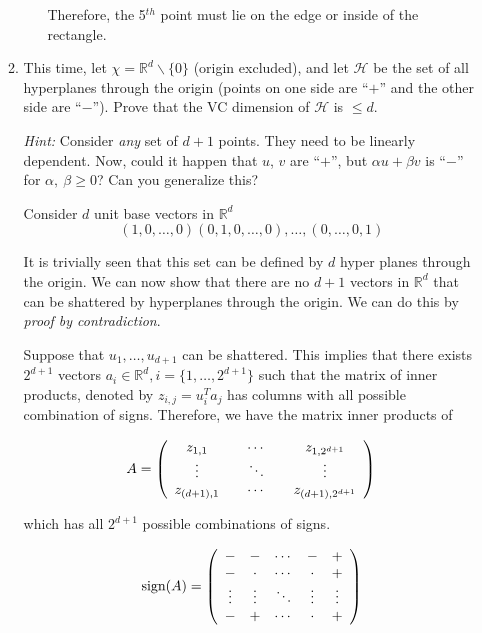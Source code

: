 \documentclass[12pt]{article}
\begin{document}
\begin{enumerate}
\begin{enumerate}
\begin{enumerate}
Therefore, the 5$^{th}$ point must lie on the edge or inside of the rectangle.

\end{enumerate}

\item This time, let $\chi = \mathbb{R}^{d}\backslash \{0\}$ (origin excluded), and let $\mathcal{H}$ be the set of all hyperplanes through the origin (points on one side are ``$+$'' and the other side are ``$-$''). Prove that the VC dimension of $\mathcal{H}$ is $\leq d$.

{\em Hint:} Consider {\em any} set of $d + 1$ points. They need to be linearly dependent. Now, could it happen that $u$, $v$ are ``$+$'', but $\alpha u + \beta v$ is ``$-$'' for $\alpha,\ \beta\geq 0$? Can you generalize this?

Consider $d$ unit base vectors in $\mathbb{R}^{d}$
\[
  (1,0,\ldots,0)(0,1,0,\ldots,0),\ldots,(0,\ldots,0,1)
\]

It is trivially seen that this set can be defined by $d$ hyper planes through the origin. We can now show that there are no $d+1$ vectors in $\mathbb{R}^{d}$ that can be shattered by hyperplanes through the origin. We can do this by {\em proof by contradiction}.

Suppose that $u_{1},\ldots,u_{d+1}$ can be shattered. This implies that there exists $2^{d+1}$ vectors $a_{i} \in \mathbb{R}^{d}, i = \{1,\ldots,2^{d+1}\}$ such that the matrix of inner products, denoted by $z_{i,j} = u_{i}^{T}a_{j}$ has columns with all possible combination of signs. Therefore, we have the matrix inner products of

\[
  A = \left( \begin{array}{c c c c c}z_{1,1} & & \cdots & & z_{1,2^{d+1}}\\
                          \vdots &  & \ddots & & \vdots\\
                          z_{(d+1),1} & & \cdots & & z_{(d+1),2^{d+1}}\end{array}\right)
\]

which has all $2^{d+1}$ possible combinations of signs.

\[
   \text{sign}(A) = \left(\begin{array}{c c c c c}- & - & \cdots & - & +\\
                          - & \cdot & \cdots & \cdot & +\\
                          \vdots & \vdots & \ddots & \vdots & \vdots\\
                          - & + & \cdots & \cdot & +\end{array}\right)
\]


\end{enumerate}
\end{enumerate}
\end{document}
